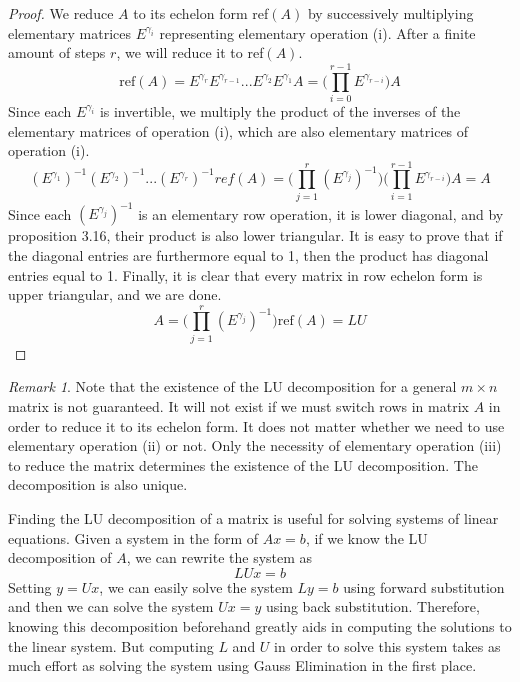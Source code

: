 \documentclass{article}
\theoremstyle{remark}
\newtheorem*{remark}{Remark}
\theoremstyle{definition}
\begin{document}
    \begin{proof}
    We reduce $A$ to its echelon form ref$(A)$ by successively multiplying elementary matrices $E^{\gamma_i}$ representing elementary operation (i). After a finite amount of steps $r$, we will reduce it to ref$(A)$.
    \[ \text{ref}(A) = E^{\gamma_r} E^{\gamma_{r-1}} ... E^{\gamma_2} E^{\gamma_1} A = \bigg(\prod_{i = 0}^{r-1} E^{\gamma_{r-i}}\bigg) A\]
    Since each $E^{\gamma_i}$ is invertible, we multiply the product of the inverses of the elementary matrices of operation (i), which are also elementary matrices of operation (i). 
    \[ (E^{\gamma_1})^{-1} (E^{\gamma_2})^{-1} ... (E^{\gamma_r})^{-1} ref(A) = \bigg( \prod_{j = 1}^r (E^{\gamma_j})^{-1} \bigg) \bigg( \prod_{i=1}^{r-1} E^{\gamma_{r-i}} \bigg) A = A \]
    Since each $(E^{\gamma_j})^{-1}$ is an elementary row operation, it is lower diagonal, and by proposition 3.16, their product is also lower triangular. It is easy to prove that if the diagonal entries are furthermore equal to 1, then the product has diagonal entries equal to 1. Finally, it is clear that every matrix in row echelon form is upper triangular, and we are done. 
    \[ A = \bigg( \prod_{j = 1}^r (E^{\gamma_j})^{-1} \bigg) \text{ref}(A) = L U\]
    \end{proof}

    \begin{remark}
    Note that the existence of the LU decomposition for a general $m \times n$ matrix is not guaranteed. It will not exist if we must switch rows in matrix $A$ in order to reduce it to its echelon form. It does not matter whether we need to use elementary operation (ii) or not. Only the necessity of elementary operation (iii) to reduce the matrix determines the existence of the LU decomposition. The decomposition is also unique. 
    \end{remark}

    Finding the LU decomposition of a matrix is useful for solving systems of linear equations. Given a system in the form of $A x = b$, if we know the LU decomposition of $A$, we can rewrite the system as 
    \[ L U x = b\]
    Setting $y = U x$, we can easily solve the system $L y = b$ using forward substitution and then we can solve the system $U x = y$ using back substitution. Therefore, knowing this decomposition beforehand greatly aids in computing the solutions to the linear system. But computing $L$ and $U$ in order to solve this system takes as much effort as solving the system using Gauss Elimination in the first place. 
\end{document}
